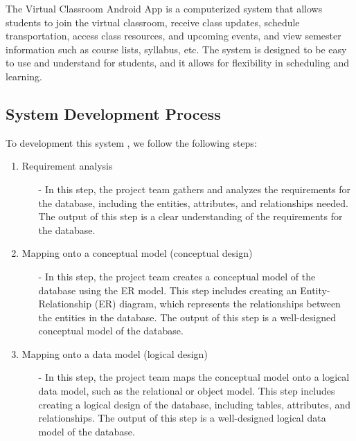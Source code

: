 The Virtual Classroom Android App is a computerized system that allows students to join the virtual classroom, receive class updates, schedule transportation, access class resources, and upcoming events, and view semester information such as course lists, syllabus, etc. The system is designed to be easy to use and understand for students, and it allows for flexibility in scheduling and learning.


\subsection{System Development Process}\label{subsec:sdp}

To development this  system ,  we follow the following steps:
\begin{enumerate}
\item Requirement analysis
	\begin{itemize}
		\item[-] In this step, the project team gathers and analyzes the requirements for the database, including the entities, attributes, and relationships needed. The output of this step is a clear understanding of the requirements for the database.
	\end{itemize}

\item Mapping onto a conceptual model (conceptual design)
     \begin{itemize}
     	\item[-] In this step, the project team creates a conceptual model of the database using the ER model. This step includes creating an Entity-Relationship (ER) diagram, which represents the relationships between the entities in the database. The output of this step is a well-designed conceptual model of the database.
     	
     \end{itemize}
     
\item Mapping onto a data model (logical design)
	\begin{itemize}
     	\item[-] In this step, the project team maps the conceptual model onto a logical data model, such as the relational or object model. This step includes creating a logical design of the database, including tables, attributes, and relationships. The output of this step is a well-designed logical data model of the database.
     \end{itemize}
     

\end{enumerate}
